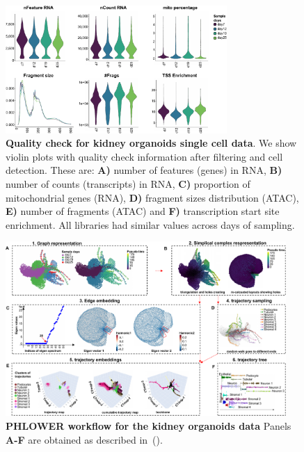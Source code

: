 \begin{figure}[!ht]
  \centering
  \includegraphics[width=0.75\textwidth]{kidney_QC//fig}
  \vspace{0.1cm}
  \caption[Kidney organoid quality check.]{\textbf{Quality check for kidney organoids single cell data}. We show violin plots with quality check information after filtering and cell detection. These are: \textbf{A)} number of features (genes) in RNA, \textbf{B)} number of counts (transcripts) in RNA, \textbf{C)} proportion of mitochondrial genes (RNA), \textbf{D)} fragment sizes distribution (ATAC), \textbf{E)} number of fragments (ATAC) and \textbf{F)} transcription start site enrichment. All libraries had similar values across days of sampling. }
  \label{supfig:kidney-qc}
\end{figure}



\begin{figure}[!ht]
  \centering
  \includegraphics[width=0.95\textwidth]{kidney_PHLOWER//fig}
  \vspace{0.1cm}
  \caption[Kidney organoid PHLOWER workflow.]{\textbf{PHLOWER workflow for the kidney organoids data} Panels \textbf{A-F} are obtained as described in~(). }
  \label{supfig:kidney-workflow}
\end{figure}


